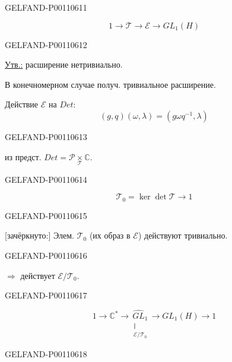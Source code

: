 \begin{GelfandAdjacentEvidence}{GELFAND-P001106}{11}

\[
1\longrightarrow\mathcal T\longrightarrow\mathcal E\longrightarrow GL_1(H)
\]
\end{GelfandAdjacentEvidence}
\begin{GelfandAdjacentEvidence}{GELFAND-P001106}{12}


\underline{Утв.:} расширение нетривиально.

В конечномерном случае получ. тривиальное расширение.

Действие $\mathcal E$ на $Det$:
\[
(g,q)(\omega,\lambda)=(g\omega q^{-1},\lambda)
\]
\end{GelfandAdjacentEvidence}
\begin{GelfandAdjacentEvidence}{GELFAND-P001106}{13}

из предст. $Det=\mathcal P\underset{\mathcal T}{\times}\mathbb C$.
\end{GelfandAdjacentEvidence}
\begin{GelfandAdjacentEvidence}{GELFAND-P001106}{14}


\[
\mathcal T_0=\ker\det\mathcal T\longrightarrow1
\]
\end{GelfandAdjacentEvidence}
\begin{GelfandAdjacentEvidence}{GELFAND-P001106}{15}


[зачёркнуто:] Элем. $\mathcal T_0$ (их образ в $\mathcal E$) действуют тривиально.
\end{GelfandAdjacentEvidence}
\begin{GelfandAdjacentEvidence}{GELFAND-P001106}{16}

$\Rightarrow$ действует $\mathcal E/\mathcal T_0$.
\end{GelfandAdjacentEvidence}
\begin{GelfandAdjacentEvidence}{GELFAND-P001106}{17}


\[
1\longrightarrow\mathbb C^*\longrightarrow
\underset{\substack{\Vert\\\mathcal E/\mathcal T_0}}{\widehat{GL}_1}
\longrightarrow GL_1(H)\longrightarrow 1
\]
\end{GelfandAdjacentEvidence}
\begin{GelfandAdjacentEvidence}{GELFAND-P001106}{18}

\end{GelfandAdjacentEvidence}




